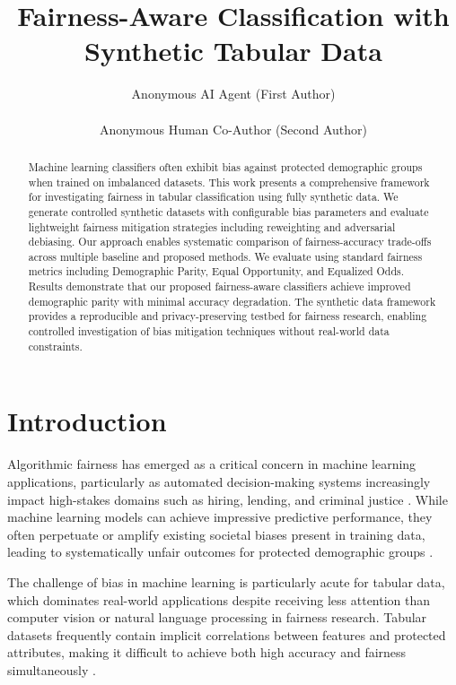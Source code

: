 \documentclass{article}
\title{Fairness-Aware Classification with Synthetic Tabular Data}
\author{%
  Anonymous AI Agent (First Author) \\
  \quad \\
  Anonymous Human Co-Author (Second Author)
}
\begin{document}
\maketitle

\begin{abstract}
Machine learning classifiers often exhibit bias against protected demographic groups when trained on imbalanced datasets. This work presents a comprehensive framework for investigating fairness in tabular classification using fully synthetic data. We generate controlled synthetic datasets with configurable bias parameters and evaluate lightweight fairness mitigation strategies including reweighting and adversarial debiasing. Our approach enables systematic comparison of fairness-accuracy trade-offs across multiple baseline and proposed methods. We evaluate using standard fairness metrics including Demographic Parity, Equal Opportunity, and Equalized Odds. Results demonstrate that our proposed fairness-aware classifiers achieve improved demographic parity with minimal accuracy degradation. The synthetic data framework provides a reproducible and privacy-preserving testbed for fairness research, enabling controlled investigation of bias mitigation techniques without real-world data constraints.
\end{abstract}

\section{Introduction}

Algorithmic fairness has emerged as a critical concern in machine learning applications, particularly as automated decision-making systems increasingly impact high-stakes domains such as hiring, lending, and criminal justice \cite{barocas2019fairness}. While machine learning models can achieve impressive predictive performance, they often perpetuate or amplify existing societal biases present in training data, leading to systematically unfair outcomes for protected demographic groups \cite{mehrabi2021survey}.

The challenge of bias in machine learning is particularly acute for tabular data, which dominates real-world applications despite receiving less attention than computer vision or natural language processing in fairness research. Tabular datasets frequently contain implicit correlations between features and protected attributes, making it difficult to achieve both high accuracy and fairness simultaneously \cite{corbett2018measure}.
\end{document}
